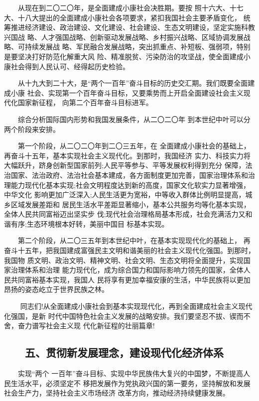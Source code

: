 \documentclass[11pt]{ctexart}
\begin{document}
{{{{　　从现在到二〇二〇年，是全面建成小康社会决胜期。要按
照十六大、十七大、十八大提出的全面建成小康社会各项要求，紧扣我国社会主要矛盾变化，
统筹推进经济建设、政治建设、文化建设、社会建设、生态文明建设，坚定实施科教兴国战
略、人才强国战略、创新驱动发展战略、乡村振兴战略、区域协调发展战略、可持续发展战
略、军民融合发展战略，突出抓重点、补短板、强弱项，特别是要坚决打好防范化解重大风
险、精准脱贫、污染防治的攻坚战，使全面建成小康社会得到人民认可、经得起历史检验。


　　从十九大到二十大，是“两个一百年”奋斗目标的历史交汇期。我们既要全面建成小康
社会、实现第一个百年奋斗目标，又要乘势而上开启全面建设社会主义现代化国家新征程，
向第二个百年奋斗目标进军。

　　综合分析国际国内形势和我国发展条件，从二〇二〇年
到本世纪中叶可以分两个阶段来安排。

　　第一个阶段，从二〇二〇年到二〇三五年，在
全面建成小康社会的基础上，再奋斗十五年，基本实现社会主义现代化。到那时，我国经济
实力、科技实力将大幅跃升，跻身创新型国家前列;人民平等参与、平等发展权利得到充分
保障，法治国家、法治政府、法治社会基本建成，各方面制度更加完善，国家治理体系和治
理能力现代化基本实现;社会文明程度达到新的高度，国家文化软实力显著增强，中华文化
影响更加广泛深入;人民生活更为宽裕，中等收入群体比例明显提高，城乡区域发展差距和
居民生活水平差距显著缩小，基本公共服务均等化基本实现，全体人民共同富裕迈出坚实步
伐;现代社会治理格局基本形成，社会充满活力又和谐有序;生态环境根本好转，美丽中国目
标基本实现。

　　第二个阶段，从二〇三五年到本世纪中叶，在基本实现现代化的基础上，
再奋斗十五年，把我国建成富强民主文明和谐美丽的社会主义现代化强国。到那时，我国物
质文明、政治文明、精神文明、社会文明、生态文明将全面提升，实现国家治理体系和治理
能力现代化，成为综合国力和国际影响力领先的国家，全体人民共同富裕基本实现，我国人
民将享有更加幸福安康的生活，中华民族将以更加昂扬的姿态屹立于世界民族之林。

　　
同志们!从全面建成小康社会到基本实现现代化，再到全面建成社会主义现代化强国，是新
时代中国特色社会主义发展的战略安排。我们要坚忍不拔、锲而不舍，奋力谱写社会主义现
代化新征程的壮丽篇章!

\subsection{　　五、贯彻新发展理念，建设现代化经济体系}
\label{sec:org3d2338d}

　　实现“两个
一百年”奋斗目标、实现中华民族伟大复兴的中国梦，不断提高人民生活水平，必须坚定不
移把发展作为党执政兴国的第一要务，坚持解放和发展社会生产力，坚持社会主义市场经济
改革方向，推动经济持续健康发展。

}}}}
\end{document}
